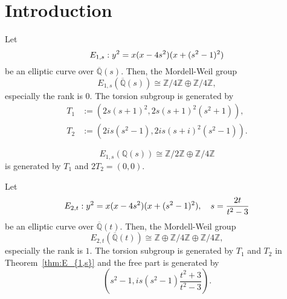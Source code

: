 \documentclass[main]{subfiles}
\begin{document}
\chapter{Introduction}

\begin{thm}
    \label{thm:E_{1,s}}
    Let
    \begin{equation}
        \label{eq:E_{1s}}
        E_{1,s}: y^{2} = x(x - 4s^{2})(x + (s^{2} - 1)^{2})
    \end{equation}
    be an elliptic curve over $\overline{\mathbb{Q}}(s)$.
    Then, the Mordell-Weil group
    \begin{equation}
        E_{1,s}(\overline{\mathbb{Q}}(s)) \cong \mathbb{Z} / 4 \mathbb{Z} \oplus \mathbb{Z} / 4 \mathbb{Z},
    \end{equation}
    especially the rank is $0$. The torsion subgroup is generated by
    \begin{align}
        T_1 & := (2s(s+1)^2, 2s(s+1)^2(s^2+1)),  \\
        T_2 & := (2is(s^2-1),2is(s+i)^2(s^2-1)).
    \end{align}
\end{thm}

\begin{cor}
    \begin{equation}
        E_{1,s}(\mathbb{Q}(s)) \cong \mathbb{Z} / 2 \mathbb{Z} \oplus \mathbb{Z} / 4 \mathbb{Z}
    \end{equation}
    is generated by $T_1$ and $2T_2=(0,0)$.
\end{cor}

\begin{thm}
    \label{thm:E_{2,t}}
    Let
    \begin{equation}
        \label{eq:E_{4t}}
        E_{2,t}: y^{2} = x(x - 4s^{2})(x + (s^{2} - 1)^{2}),\quad s = \frac{2t}{t^{2} - 3}
    \end{equation}
    be an elliptic curve over $\overline{\mathbb{Q}}(t)$.
    Then, the Mordell-Weil group
    \begin{equation}
        E_{2,t}(\overline{\mathbb{Q}}(t)) \cong \mathbb{Z} \oplus \mathbb{Z} / 4 \mathbb{Z} \oplus \mathbb{Z} / 4 \mathbb{Z},
    \end{equation}
    especially the rank is $1$.
    The torsion subgroup is generated by $T_1$ and $T_2$ in Theorem~\ref{thm:E_{1,s}} and the free part is generated by
    \begin{equation}
        \left(s^{2} - 1, i s(s^{2} - 1) \frac{t^{2} + 3}{t^{2} - 3} \right).
    \end{equation}
\end{thm}
\end{document}
